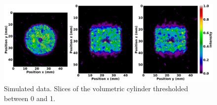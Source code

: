 \documentclass[utf8]{FrontiersinHarvard} %
\begin{document}
\begin{figure}[h!]
\begin{center}
\includegraphics[width=\textwidth]{Figures/DOI_CylVol_bug}
\end{center}
\caption{Simulated data. Slices of the volumetric cylinder thresholded between 0 and 1.}
\label{fig:DOIbug}
\end{figure}










\end{document}
